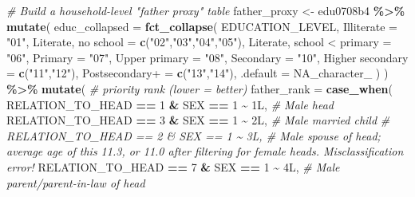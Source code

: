 \documentclass[
]{article}
\newenvironment{Shaded}{\begin{snugshade}}{\end{snugshade}}
\newcommand{\AttributeTok}[1]{\textcolor[rgb]{0.13,0.29,0.53}{#1}}
\newcommand{\CommentTok}[1]{\textcolor[rgb]{0.56,0.35,0.01}{\textit{#1}}}
\newcommand{\ConstantTok}[1]{\textcolor[rgb]{0.56,0.35,0.01}{#1}}
\newcommand{\DataTypeTok}[1]{\textcolor[rgb]{0.13,0.29,0.53}{#1}}
\newcommand{\DecValTok}[1]{\textcolor[rgb]{0.00,0.00,0.81}{#1}}
\newcommand{\FunctionTok}[1]{\textcolor[rgb]{0.13,0.29,0.53}{\textbf{#1}}}
\newcommand{\NormalTok}[1]{#1}
\newcommand{\OtherTok}[1]{\textcolor[rgb]{0.56,0.35,0.01}{#1}}
\newcommand{\SpecialCharTok}[1]{\textcolor[rgb]{0.81,0.36,0.00}{\textbf{#1}}}
\newcommand{\StringTok}[1]{\textcolor[rgb]{0.31,0.60,0.02}{#1}}
\begin{document}
\begin{Shaded}
\begin{Highlighting}[]
\CommentTok{\# Build a household{-}level "father proxy" table}
\NormalTok{father\_proxy }\OtherTok{\textless{}{-}}\NormalTok{ edu0708b4 }\SpecialCharTok{\%\textgreater{}\%}
  \FunctionTok{mutate}\NormalTok{(}
    \AttributeTok{educ\_collapsed =} \FunctionTok{fct\_collapse}\NormalTok{(}
\NormalTok{      EDUCATION\_LEVEL,}
      \AttributeTok{Illiterate =} \StringTok{"01"}\NormalTok{,}
      \StringTok{\textasciigrave{}}\AttributeTok{Literate, no school}\StringTok{\textasciigrave{}} \OtherTok{=} \FunctionTok{c}\NormalTok{(}\StringTok{"02"}\NormalTok{,}\StringTok{"03"}\NormalTok{,}\StringTok{"04"}\NormalTok{,}\StringTok{"05"}\NormalTok{),}
      \StringTok{\textasciigrave{}}\AttributeTok{Literate, school \textless{} primary}\StringTok{\textasciigrave{}} \OtherTok{=} \StringTok{"06"}\NormalTok{,}
      \AttributeTok{Primary =} \StringTok{"07"}\NormalTok{,}
      \StringTok{\textasciigrave{}}\AttributeTok{Upper primary}\StringTok{\textasciigrave{}} \OtherTok{=} \StringTok{"08"}\NormalTok{,}
      \AttributeTok{Secondary =} \StringTok{"10"}\NormalTok{,}
      \StringTok{\textasciigrave{}}\AttributeTok{Higher secondary}\StringTok{\textasciigrave{}} \OtherTok{=} \FunctionTok{c}\NormalTok{(}\StringTok{"11"}\NormalTok{,}\StringTok{"12"}\NormalTok{),}
      \StringTok{\textasciigrave{}}\AttributeTok{Postsecondary+}\StringTok{\textasciigrave{}} \OtherTok{=} \FunctionTok{c}\NormalTok{(}\StringTok{"13"}\NormalTok{,}\StringTok{"14"}\NormalTok{),}
      \AttributeTok{.default =} \ConstantTok{NA\_character\_}
\NormalTok{    )}
\NormalTok{  ) }\SpecialCharTok{\%\textgreater{}\%}
  \FunctionTok{mutate}\NormalTok{(}
    \CommentTok{\# priority rank (lower = better)}
    \AttributeTok{father\_rank =} \FunctionTok{case\_when}\NormalTok{(}
\NormalTok{      RELATION\_TO\_HEAD }\SpecialCharTok{==} \DecValTok{1} \SpecialCharTok{\&}\NormalTok{ SEX }\SpecialCharTok{==} \DecValTok{1} \SpecialCharTok{\textasciitilde{}} \DecValTok{1}\DataTypeTok{L}\NormalTok{, }\CommentTok{\# Male head}
\NormalTok{      RELATION\_TO\_HEAD }\SpecialCharTok{==} \DecValTok{3} \SpecialCharTok{\&}\NormalTok{ SEX }\SpecialCharTok{==} \DecValTok{1} \SpecialCharTok{\textasciitilde{}} \DecValTok{2}\DataTypeTok{L}\NormalTok{, }\CommentTok{\# Male married child}
\CommentTok{\#      RELATION\_TO\_HEAD == 2 \& SEX == 1 \textasciitilde{} 3L, \# Male spouse of head; average age of this 11.3, or 11.0 after filtering for female heads. Misclassification error!}
\NormalTok{      RELATION\_TO\_HEAD }\SpecialCharTok{==} \DecValTok{7} \SpecialCharTok{\&}\NormalTok{ SEX }\SpecialCharTok{==} \DecValTok{1} \SpecialCharTok{\textasciitilde{}} \DecValTok{4}\DataTypeTok{L}\NormalTok{, }\CommentTok{\# Male parent/parent{-}in{-}law of head}

\end{Highlighting}
\end{Shaded}
\end{document}

